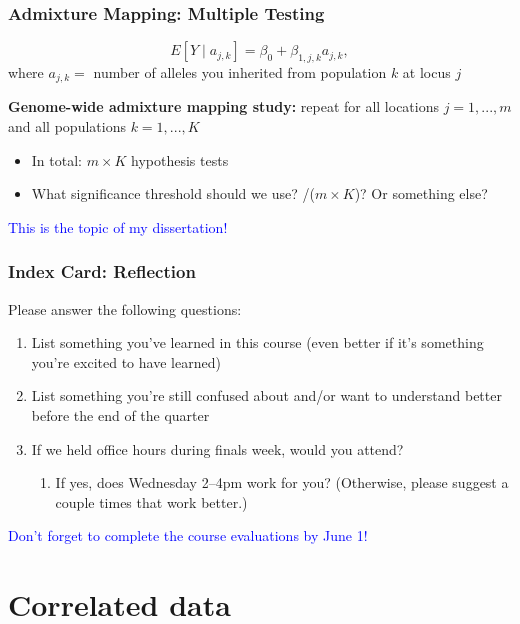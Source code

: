 \documentclass[12pt, 
hyperref={colorlinks=true, linkcolor=blue, urlcolor=cyan},dvipsnames]{beamer}
\begin{document}
\begin{frame}
\frametitle{Admixture Mapping: Multiple Testing}

$$E[Y \mid a_{j,k}] = \beta_0 + \beta_{1,j,k} a_{j,k},$$
where $a_{j,k} = $ number of alleles you inherited from population $k$ at locus $j$

\textbf{Genome-wide admixture mapping study:} repeat for all locations $j = 1, ..., m$ and all populations $k = 1, ..., K$

\begin{itemize}
\item In total: $m \times K$ hypothesis tests
\item What significance threshold should we use? /($m\times K$)? Or something else?
\end{itemize}

\textcolor{blue}{This is the topic of my dissertation!}

\end{frame}


\begin{frame}
\frametitle{Index Card: Reflection}

Please answer the following questions:
\begin{enumerate}
\item List something you've learned in this course (even better if it's something you're excited to have learned)
\item List something you're still confused about and/or want to understand better before the end of the quarter
\item If we held office hours during finals week, would you attend?
	\begin{enumerate}
	\item If yes, does Wednesday 2--4pm work for you? (Otherwise, please suggest a couple times that work better.)
	\end{enumerate}
\end{enumerate}

\textcolor{blue}{Don't forget to complete the course evaluations by June 1!}

\end{frame}


\section{Correlated data}
\end{document}

